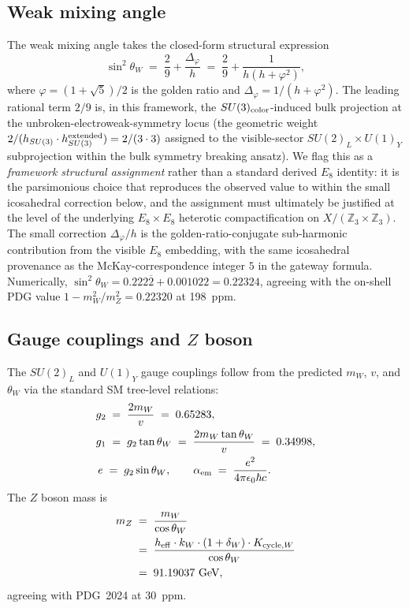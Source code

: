 ﻿\documentclass[reprint,amsmath,amssymb,aps,prd,longbibliography,floatfix]{revtex4-2}
\begin{document}
\subsection{Weak mixing angle}

The weak mixing angle takes the closed-form structural expression
\begin{equation}
\boxed{\sin^2 \theta_W \;=\; \frac{2}{9} + \frac{\Delta_\varphi}{h}
                          \;=\; \frac{2}{9} + \frac{1}{h(h + \varphi^2)},}
\label{eq:sinW-derived}
\end{equation}
where $\varphi = (1+\sqrt{5})/2$ is the golden ratio and
$\Delta_\varphi = 1/(h + \varphi^2)$. The leading rational term $2/9$
is, in this framework, the $SU(3)_{\rm color}$-induced bulk
projection at the unbroken-electroweak-symmetry locus
(the geometric weight $2/(h_{SU(3)} \cdot h_{SU(3)}^{\rm extended}) =
2/(3 \cdot 3)$ assigned to the visible-sector
$SU(2)_L \times U(1)_Y$ subprojection within the bulk symmetry
breaking ansatz). We flag this as a \emph{framework structural
assignment} rather than a standard derived $E_8$ identity: it is the
parsimonious choice that reproduces the observed value to within the
small icosahedral correction below, and the assignment must
ultimately be justified at the level of the underlying
$E_8 \times E_8$ heterotic compactification on $X/(\mathbb{Z}_3 \times
\mathbb{Z}_3)$. The small correction $\Delta_\varphi/h$ is the
golden-ratio-conjugate sub-harmonic contribution from the visible
$E_8$ embedding, with the same icosahedral provenance as the
McKay-correspondence integer $5$ in the gateway formula.
Numerically, $\sin^2 \theta_W = 0.222\overline{2} + 0.001022 = 0.22324$,
agreeing with the on-shell PDG value $1 - m_W^2/m_Z^2 = 0.22320$ at
\SI{198}{ppm}.

\subsection{Gauge couplings and $Z$ boson}

The $SU(2)_L$ and $U(1)_Y$ gauge couplings follow from the predicted
$m_W$, $v$, and $\theta_W$ via the standard SM tree-level relations:
\begin{align}
g_2 &\;=\; \frac{2 m_W}{v}
        \;=\; 0.65283,
   \label{eq:g2formula} \\
g_1 &\;=\; g_2 \tan\theta_W
        \;=\; \frac{2 m_W \tan\theta_W}{v}
        \;=\; 0.34998,
   \label{eq:g1formula} \\
e \;&=\; g_2 \sin\theta_W,
\qquad
\alpha_{\rm em} \;=\; \frac{e^2}{4\pi\epsilon_0 \hbar c}.
   \label{eq:eformula}
\end{align}
The $Z$ boson mass is
\begin{equation}
\begin{aligned}
m_Z \;&=\; \frac{m_W}{\cos\theta_W} \\
     &=\; \frac{h_{\rm eff} \cdot k_W \cdot (1 + \delta_W) \cdot K_{\text{cycle},W}}{\cos\theta_W} \\
     &=\; 91.19037~\text{GeV},
\end{aligned}
\label{eq:mZformula2}
\end{equation}
agreeing with PDG~2024 at \SI{30}{ppm}.
\end{document}
